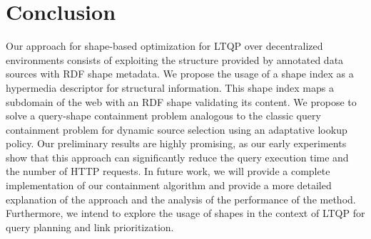 \section{Conclusion}
Our approach for shape-based optimization for LTQP over decentralized environments consists of exploiting the structure provided by
annotated data sources with RDF shape metadata. 
We propose the usage of a shape index as a hypermedia descriptor for structural information.
This shape index maps a subdomain of the web with an RDF shape validating its content.
We propose to solve a query-shape containment problem analogous to the classic query containment problem for dynamic source selection
using an adaptative lookup policy. 
Our preliminary results are highly promising,
as our early experiments show that this approach can significantly reduce the query execution time and the number of HTTP requests.
In future work, we will provide a complete implementation of our containment algorithm and provide a more
detailed explanation of the approach and the analysis of the performance of the method.
Furthermore, we intend to explore the usage of shapes in the context of LTQP for query planning and link prioritization.